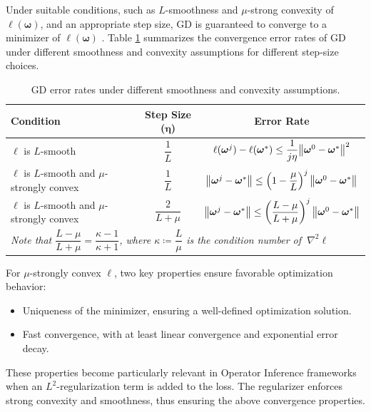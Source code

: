 Under suitable conditions, such as $L$-smoothness and $\mu$-strong convexity of $\ell(\bm\omega)$, and an appropriate step size, GD is guaranteed to converge to a minimizer of $\ell(\bm\omega)$ \cite{garrigos2023handbook}. Table \ref{tab:table-01} summarizes the convergence error rates of GD under different smoothness and convexity assumptions for different step-size choices.

\begin{table}[!htpb]
    \centering
    \begin{tabular}{lcc}
        \toprule
        \textbf{Condition} & \textbf{Step Size ($\bm\eta$)} & \textbf{Error Rate} \\ 
        \midrule
        $\ell$ is $L$-smooth  & $\dfrac{1}{L}$  & $\ell(\bm\omega^{j}) - \ell(\bm\omega^{*}) \le \dfrac{1}{j\eta}\norm{\bm\omega^0 - \bm\omega^*}^2$  \\
        \midrule
        \makecell{$\ell$ is $L$-smooth and\\$\mu$-strongly convex}   & $\dfrac{1}{L}$ & $\norm{\bm\omega^{j} - \bm\omega^{*}} \le \left(1-\dfrac{\mu}{L}\right)^j\norm{\bm\omega^0 - \bm\omega^*}$  \\
        \midrule
        \makecell{$\ell$ is $L$-smooth and\\$\mu$-strongly convex}   & $\dfrac{2}{L+\mu}$   & $\norm{\bm\omega^{j} - \bm\omega^{*}} \le \left(\dfrac{L-\mu}{L+\mu}\right)^j\norm{\bm\omega^0 - \bm\omega^*}$  \\
        [1.5em]
        \multicolumn{3}{l}{\textit{Note that $\dfrac{L-\mu}{L+\mu}=\dfrac{\kappa-1}{\kappa+1}$, where $\kappa\coloneqq\dfrac{L}{\mu}$ is the condition number of $~\nabla^2\ell$}} \\
        \bottomrule
    \end{tabular}
    \caption{GD error rates under different smoothness and convexity assumptions.}
    \label{tab:table-01}
\end{table}

For $\mu$-strongly convex $\ell$, two key properties ensure favorable optimization behavior:
\begin{itemize}
    \item Uniqueness of the minimizer, ensuring a well-defined optimization solution.
    \item Fast convergence, with at least linear convergence and exponential error decay. 
\end{itemize}

These properties become particularly relevant in Operator Inference frameworks when an $L^2$-regularization term is added to the loss.  The regularizer enforces strong convexity and smoothness, thus ensuring the above convergence properties.

